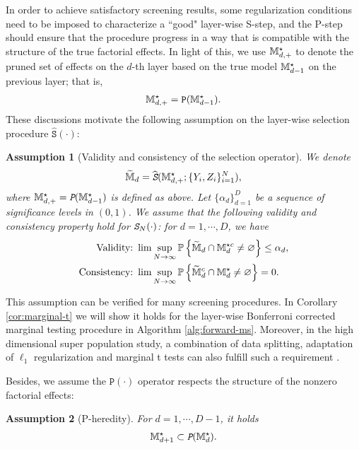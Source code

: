 \documentclass[12pt]{article}
\newtheorem{assumption}{Assumption}
\begin{document}
In order to achieve satisfactory screening results, some regularization conditions need to be imposed to characterize a ``good" layer-wise S-step, and the P-step should ensure that the procedure progress in a way that is compatible with the structure of the true factorial effects.  In light of this, we use ${{\mathbb{M}}}^\star_{d,+}$ to denote the pruned set of effects on the $d$-th layer based on the true model ${\mathbb{M}}_{d-1}^\star$ on the previous layer; that is,
\begin{align*}
    {{\mathbb{M}}}^\star_{d,+} = \texttt{P}({{\mathbb{M}}}^\star_{d-1}).
\end{align*}
These discussions motivate the following assumption on the layer-wise selection procedure $\hat{\texttt{S}}(\cdot)$:
\begin{assumption}[Validity and consistency of the selection operator]\label{asp:valid-consistent}
We denote 
\begin{align*}
    \widetilde{{\mathbb{M}}}_{d} = \widehat{\text{\em \texttt{S}}}({\mathbb{M}}^{\star}_{d,+};\{Y_i,Z_i\}^N_{i=1}),
\end{align*}
where ${\mathbb{M}}^{\star}_{d,+} = \text{\em \texttt{P}}({\mathbb{M}}^{\star}_{d-1})$ is defined as above. Let $\{\alpha_d\}_{d=1}^D$ be a sequence of significance levels in $(0,1)$. We assume that the following \emph{validity} and \emph{consistency} property hold for $\text{\em \texttt{S}}_N(\cdot)$: for $d = 1,\cdots, D$, we have
\begin{align}
    \text{Validity:}&~\lim\sup_{N\to\infty}{\mathbb{P}}\left\{\widetilde{{\mathbb{M}}}_{d}\cap{\mathbb{M}}^{\star c}_d\neq \varnothing\right\}\le \alpha_d,  \label{eqn:validity}\\
    \text{Consistency:}&~\lim\sup_{N\to\infty}{\mathbb{P}}\left\{\widetilde{{\mathbb{M}}}_{d}^c\cap{\mathbb{M}}^{\star}_d\neq \varnothing\right\} = 0.  \label{eqn:consistency}
\end{align}
\end{assumption}


This assumption can be verified for many  screening procedures. In Corollary \ref{cor:marginal-t} we will show it holds for the layer-wise Bonferroni corrected marginal testing procedure in Algorithm \ref{alg:forward-ms}. Moreover, in the high dimensional super population study, a combination of data splitting, adaptation of $\ell_1$ regularization and marginal t tests can also fulfill such a requirement \citep{wasserman2009high}.




Besides, we assume the $\texttt{P}(\cdot)$ operator respects the structure of the nonzero factorial effects:
\begin{assumption}[P-heredity]\label{asp:P-heredity}
For $d=1,\cdots,D-1$, it holds
\begin{align*}
{\mathbb{M}}^\star_{d+1}\subset\texttt{\em P}({\mathbb{M}}^\star_{d}).
\end{align*}
\end{assumption}
\end{document}
